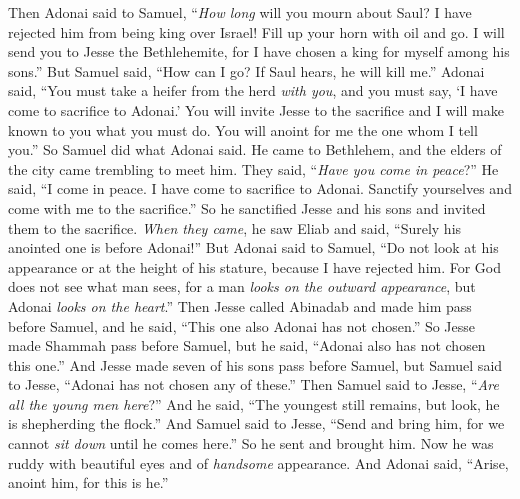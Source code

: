 \begin{biblechapter} %
 Then Adonai said to Samuel, “\textit{How long} will you mourn about Saul? I have rejected him from being king over Israel! Fill up your horn with oil and go. I will send you to Jesse the Bethlehemite, for I have chosen a king for myself among his sons.”
\verse But Samuel said, “How can I go? If Saul hears, he will kill me.” Adonai said, “You must take a heifer from the herd \textit{with you}, and you must say, ‘I have come to sacrifice to Adonai.’
\verse You will invite Jesse to the sacrifice and I will make known to you what you must do. You will anoint for me the one whom I tell you.”
\verse So Samuel did what Adonai said. He came to Bethlehem, and the elders of the city came trembling to meet him. They said, “\textit{Have you come in peace}?”
\verse He said, “I come in peace. I have come to sacrifice to Adonai. Sanctify yourselves and come with me to the sacrifice.” So he sanctified Jesse and his sons and invited them to the sacrifice.
\verse \textit{When they came}, he saw Eliab and said, “Surely his anointed one is before Adonai!”
\verse But Adonai said to Samuel, “Do not look at his appearance or at the height of his stature, because I have rejected him. For God does not see what man sees, for a man \textit{looks on the outward appearance}, but Adonai \textit{looks on the heart}.”
\verse Then Jesse called Abinadab and made him pass before Samuel, and he said, “This one also Adonai has not chosen.”
\verse So Jesse made Shammah pass before Samuel, but he said, “Adonai also has not chosen this one.”
\verse And Jesse made seven of his sons pass before Samuel, but Samuel said to Jesse, “Adonai has not chosen any of these.”
\verse Then Samuel said to Jesse, “\textit{Are all the young men here}?” And he said, “The youngest still remains, but look, he is shepherding the flock.” And Samuel said to Jesse, “Send and bring him, for we cannot \textit{sit down} until he comes here.”
\verse So he sent and brought him. Now he was ruddy with beautiful eyes and of \textit{handsome} appearance. And Adonai said, “Arise, anoint him, for this is he.”

\end{biblechapter}
